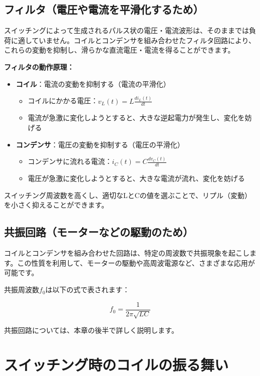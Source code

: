 \subsection{フィルタ（電圧や電流を平滑化するため）}

スイッチングによって生成されるパルス状の電圧・電流波形は、そのままでは負荷に適していません。コイルとコンデンサを組み合わせたフィルタ回路により、これらの変動を抑制し、滑らかな直流電圧・電流を得ることができます。

\textbf{フィルタの動作原理：}

\begin{itemize}
\item \textbf{コイル}：電流の変動を抑制する（電流の平滑化）
\begin{itemize}
\item コイルにかかる電圧：$v_L(t) = L \frac{di_L(t)}{dt}$
\item 電流が急激に変化しようとすると、大きな逆起電力が発生し、変化を妨げる
\end{itemize}

\item \textbf{コンデンサ}：電圧の変動を抑制する（電圧の平滑化）
\begin{itemize}
\item コンデンサに流れる電流：$i_C(t) = C \frac{dv_C(t)}{dt}$
\item 電圧が急激に変化しようとすると、大きな電流が流れ、変化を妨げる
\end{itemize}
\end{itemize}

スイッチング周波数を高くし、適切なLとCの値を選ぶことで、リプル（変動）を小さく抑えることができます。

\subsection{共振回路（モーターなどの駆動のため）}

コイルとコンデンサを組み合わせた回路は、特定の周波数で共振現象を起こします。この性質を利用して、モーターの駆動や高周波電源など、さまざまな応用が可能です。

共振周波数$f_0$は以下の式で表されます：

\begin{equation}
f_0 = \frac{1}{2\pi\sqrt{LC}}
\end{equation}

共振回路については、本章の後半で詳しく説明します。

\section{スイッチング時のコイルの振る舞い}

